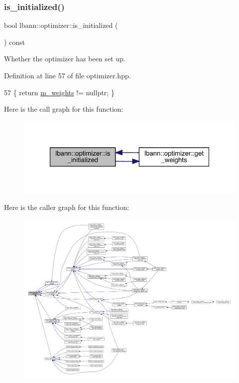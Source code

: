 \subsubsection{\texorpdfstring{is\+\_\+initialized()}{is\_initialized()}}
{\footnotesize\ttfamily bool lbann\+::optimizer\+::is\+\_\+initialized (\begin{DoxyParamCaption}{ }\end{DoxyParamCaption}) const\hspace{0.3cm}{\ttfamily [inline]}}

Whether the optimizer has been set up. 

Definition at line 57 of file optimizer.\+hpp.


\begin{DoxyCode}
57 \{ \textcolor{keywordflow}{return} \hyperlink{classlbann_1_1optimizer_a33b57b578a089d9ffe6715bb3996907c}{m\_weights} != \textcolor{keyword}{nullptr}; \}
\end{DoxyCode}
Here is the call graph for this function\+:\nopagebreak
\begin{figure}[H]
\begin{center}
\leavevmode
\includegraphics[width=321pt]{classlbann_1_1optimizer_abccf0babf69e3d7c6e9a7fd0731c79b7_cgraph}
\end{center}
\end{figure}
Here is the caller graph for this function\+:\nopagebreak
\begin{figure}[H]
\begin{center}
\leavevmode
\includegraphics[width=350pt]{classlbann_1_1optimizer_abccf0babf69e3d7c6e9a7fd0731c79b7_icgraph}
\end{center}
\end{figure}
